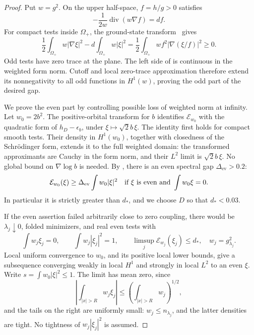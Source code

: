\begin{proof}
Put \(w=g^2\).  On the upper half-space, \(f=h/g>0\) satisfies
\[
 -\frac1{2w}\operatorname{div}(w\nabla f)=df.
\]
For compact tests inside \(\Omega_+\), the ground-state
transform~\cite[Section~2.3, equation~(2.12)]{FS08} gives
\begin{equation}\label{eq:odd-ground-transform}
 \frac12\int_{\Omega_+}w|\nabla\xi|^2
       -d\int_{\Omega_+}w|\xi|^2
 =\frac12\int_{\Omega_+}wf^2
                 |\nabla(\xi/f)|^2\ge0.
\end{equation}
Odd tests have zero trace at the plane.  The left side of
 is continuous in the weighted form
norm.  Cutoff and local zero-trace approximation therefore extend
its nonnegativity to all odd
functions in \(H^1(w)\), proving the odd part of the desired gap.

We prove the even part by controlling possible loss of weighted norm
at infinity.  Let \(w_0=2b^2\).  The positive-orbital transform for
\(b\) identifies \(\mathcal E_{w_0}\) with the quadratic form of
\(h_D-\epsilon_b\), under \(\xi\mapsto\sqrt2b\,\xi\).
The identity first holds for compact smooth tests.  Their density in
\(H^1(w_0)\), together with closedness of the Schr\"odinger form,
extends it to the full weighted domain: the transformed approximants
are Cauchy in the form norm, and their \(L^2\) limit is
\(\sqrt2b\,\xi\).  No global bound on \(\nabla\log b\) is needed.
By , there is an even spectral gap
\(\Delta_{\mathrm{ev}}>0.2\):
\begin{equation}\label{eq:unperturbed-even-gap}
 \mathcal E_{w_0}(\xi)\ge
       \Delta_{\mathrm{ev}}\int w_0|\xi|^2
       \quad\hbox{if \(\xi\) is even and }\int w_0\xi=0.
\end{equation}
In particular it is strictly greater than \(d_*\), and we choose
\(D\) so that \(d_*<0.03\).

If the even assertion failed arbitrarily close to zero coupling,
there would be \(\lambda_j\downarrow0\), folded minimizers, and real
even tests with
\[
 \int w_j\xi_j=0,\qquad
 \int w_j|\xi_j|^2=1,\qquad
 \limsup_j\mathcal E_{w_j}(\xi_j)\le d_*,
 \quad w_j=g_{\lambda_j}^2.
\]
Local uniform convergence to \(w_0\), and its positive local lower
bounds, give a subsequence converging weakly in local \(H^1\)
and strongly in local \(L^2\) to an even \(\xi\).
Write \(s=\int w_0|\xi|^2\le1\).  The limit has mean zero, since
\[
 \left|\int_{|x|>R}w_j\xi_j\right|
       \le\left(\int_{|x|>R}w_j\right)^{1/2},
\]
and the tails on the right are uniformly small:
\(w_j\le n_{\lambda_j}\), and the latter densities are tight.
No tightness of \(w_j|\xi_j|^2\) is assumed.


\end{proof}
